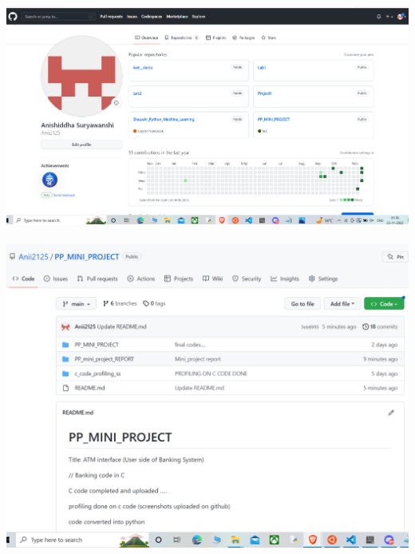 \documentclass{article}
\begin{document}
\includegraphics[scale=0.35]{github1.png}  \\ \\
\includegraphics[scale=0.35]{github2.png}  \\ \\
    
 
\end{document}

